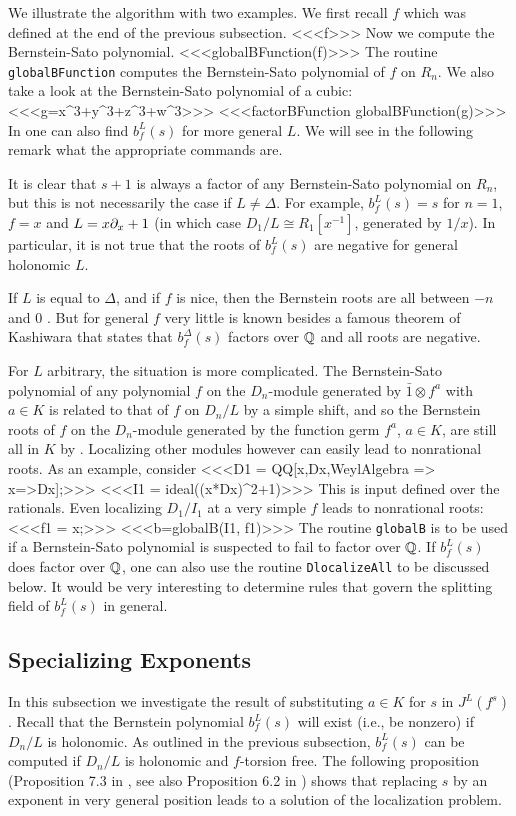 We illustrate the algorithm with two examples. We first recall $f$
which was defined at the end of the previous subsection.
<<<f>>>
Now we compute the Bernstein-Sato polynomial. 
<<<globalBFunction(f)>>>
The routine {\tt globalBFunction} computes the
Bernstein-Sato polynomial of $f$ on $R_n$. We also take a look at the
Bernstein-Sato polynomial of a cubic:
<<<g=x^3+y^3+z^3+w^3>>>
<<<factorBFunction globalBFunction(g)>>>
In \Mtwo one can also find $b^L_f(s)$ for more general $L$. We will
see in the following remark what the appropriate commands are. 
 
\begin{remark}
It is clear that $s+1$ is always a factor of any Bernstein-Sato
polynomial on $R_n$, but this is not necessarily the case if $L\not =
\Delta$. For example, 
$b^L_f(s)=s$ for $n=1$, $f=x$ and $L=x\partial_x+1$ (in which case
$D_1/L\cong R_1[x^{-1}]$, generated by ${1}/{x}$). 
In particular, it is not true that
the roots of $b_f^L(s)$ are negative for general holonomic $L$. 

If $L$ is equal to $\Delta$, and if
$f$ is nice, then the Bernstein roots are all between $-n$ and $0$
\cite{DM:Varchenko}.  But for  general $f$ very little is known besides
a famous theorem of Kashiwara
 that states that $b^\Delta_f(s)$ factors over
${\mathbb Q}$ \cite{DM:K} and all roots are negative.

For $L$ arbitrary, the situation is more complicated.
The Bernstein-Sato polynomial of any polynomial $f$ on the
$D_n$-module generated by $\bar 1\otimes f^a$ with $a\in K$ is
related to that of $f$ on $D_n/L$ by a simple shift, and so the
Bernstein roots of $f$ on the $D_n$-module generated by the function
germ $f^a$, $a\in K$,  
are still all
in $K$  by
\cite{DM:K}. Localizing other modules however can easily lead to
nonrational roots. As an example, consider
<<<D1 = QQ[x,Dx,WeylAlgebra => {x=>Dx}];>>>
<<<I1 = ideal((x*Dx)^2+1)>>>
This is input defined over the rationals.
Even localizing $D_1/I_1$ at a very simple $f$ leads to nonrational roots:
<<<f1 = x;>>>
<<<b=globalB(I1, f1)>>>
The routine {\tt globalB} is to be used if a Bernstein-Sato polynomial
is suspected to fail to factor over ${\mathbb Q}$. If $b_f^L(s)$ does factor
over ${\mathbb Q}$, one can also use the routine {\tt DlocalizeAll} to be
discussed below. It
would be very interesting to determine rules that govern the splitting field
of $b^L_f(s)$ in general.


\end{remark}

\subsection{Specializing Exponents}
In this subsection we investigate the result of substituting $a\in K$
for $s$ in $J^L(f^s)$.
Recall that the Bernstein polynomial $b^L_f(s)$  
will exist (i.e., be nonzero) if $D_n/L$ 
is holonomic. As outlined in the previous subsection, $b^L_f(s)$ can
be computed if $D_n/L$ is holonomic and $f$-torsion free. 
The following proposition 
(Proposition 7.3 in \cite{DM:Oa3}, see also Proposition 6.2 in \cite{DM:K})
 shows that replacing $s$ by an
exponent in very general position 
leads to a solution of the localization problem.

